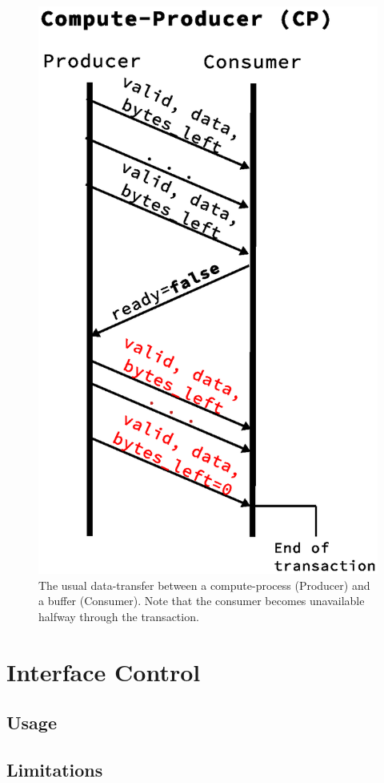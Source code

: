 \begin{figure}
	\centering
	\includegraphics[scale=0.5]{implementation/compute_producer.eps}
	\caption{The usual data-transfer between a compute-process (Producer) and a
	buffer (Consumer). Note that the consumer becomes unavailable halfway through the
	transaction.}
	\label{fig:compute_producer}
\end{figure}



\section{Interface Control}
\subsection{Usage}
\subsection{Limitations}

